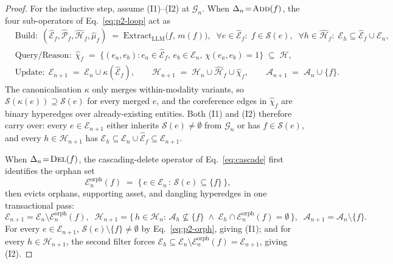 \documentclass{article}
\begin{document}
\begin{proof}
For the inductive step, assume (I1)--(I2) at $\mathcal{G}_n$. When $\Delta_n\!=\!\textsc{Add}(f)$, the four sub-operators of Eq.~\eqref{eq:p2-loop} act as
\begin{equation}
\begin{aligned}
&\text{Build}:\;(\hat{\mathcal{E}}_f,\hat{\mathcal{P}}_f,\hat{\mathcal{H}}_f,\hat{\mu}_f)\;=\;\mathrm{Extract}_{\mathrm{LLM}}\!\bigl(f,\,m(f)\bigr),\;\;\forall e\!\in\!\hat{\mathcal{E}}_f\!:\;f\!\in\!\mathcal{S}(e),\;\;\forall h\!\in\!\hat{\mathcal{H}}_f\!:\;\mathcal{E}_h\!\subseteq\!\hat{\mathcal{E}}_f\!\cup\!\mathcal{E}_n,\\[2pt]
&\text{Query/Reason}:\;\hat{\chi}_f\;=\;\bigl\{(e_a,e_b)\!:\!e_a\!\in\!\hat{\mathcal{E}}_f,\,e_b\!\in\!\mathcal{E}_n,\,\chi(e_a,e_b)\!=\!1\bigr\}\;\subseteq\;\mathcal{H},\\[2pt]
&\text{Update}:\;\mathcal{E}_{n+1}\;=\;\mathcal{E}_n\!\cup\!\kappa(\hat{\mathcal{E}}_f),\qquad \mathcal{H}_{n+1}\;=\;\mathcal{H}_n\!\cup\!\hat{\mathcal{H}}_f\!\cup\!\hat{\chi}_f,\qquad \mathcal{A}_{n+1}\;=\;\mathcal{A}_n\!\cup\!\{f\}.
\end{aligned}
\label{eq:p2-add-state}
\end{equation}
The canonicalisation $\kappa$ only merges within-modality variants, so $\mathcal{S}(\kappa(e))\!\supseteq\!\mathcal{S}(e)$ for every merged $e$, and the coreference edges in $\hat{\chi}_f$ are binary hyperedges over already-existing entities. Both (I1) and (I2) therefore carry over: every $e\!\in\!\mathcal{E}_{n+1}$ either inherits $\mathcal{S}(e)\!\neq\!\emptyset$ from $\mathcal{G}_n$ or has $f\!\in\!\mathcal{S}(e)$, and every $h\!\in\!\mathcal{H}_{n+1}$ has $\mathcal{E}_h\!\subseteq\!\mathcal{E}_n\!\cup\!\hat{\mathcal{E}}_f\!\subseteq\!\mathcal{E}_{n+1}$.

When $\Delta_n\!=\!\textsc{Del}(f)$, the cascading-delete operator of Eq.~\eqref{eq:cascade} first identifies the orphan set
\begin{equation}
\mathcal{E}_n^{\mathrm{orph}}(f)\;=\;\bigl\{\,e\!\in\!\mathcal{E}_n\,:\,\mathcal{S}(e)\!\subseteq\!\{f\}\,\bigr\},
\label{eq:p2-orph}
\end{equation}
then evicts orphans, supporting asset, and dangling hyperedges in one transactional pass:
\begin{equation}
\mathcal{E}_{n+1}\!=\!\mathcal{E}_n\!\setminus\!\mathcal{E}_n^{\mathrm{orph}}(f),\;\;
\mathcal{H}_{n+1}\!=\!\bigl\{\,h\!\in\!\mathcal{H}_n\!:\,\mathcal{A}_h\!\not\subseteq\!\{f\}\;\wedge\;\mathcal{E}_h\!\cap\!\mathcal{E}_n^{\mathrm{orph}}(f)\!=\!\emptyset\,\bigr\},\;\;
\mathcal{A}_{n+1}\!=\!\mathcal{A}_n\!\setminus\!\{f\}.
\label{eq:p2-del-state}
\end{equation}
For every $e\!\in\!\mathcal{E}_{n+1}$, $\mathcal{S}(e)\!\setminus\!\{f\}\!\neq\!\emptyset$ by Eq.~\eqref{eq:p2-orph}, giving (I1); and for every $h\!\in\!\mathcal{H}_{n+1}$, the second filter forces $\mathcal{E}_h\!\subseteq\!\mathcal{E}_n\!\setminus\!\mathcal{E}_n^{\mathrm{orph}}(f)\!=\!\mathcal{E}_{n+1}$, giving (I2).


\end{proof}
\end{document}
